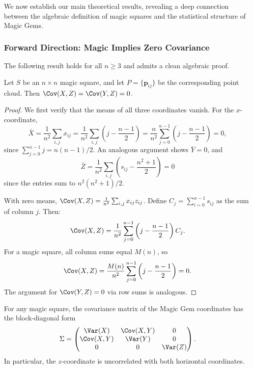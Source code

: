 We now establish our main theoretical results, revealing a deep connection 
between the algebraic definition of magic squares and the statistical structure of Magic Gems.

\subsubsection{Forward Direction: Magic Implies Zero Covariance}

The following result holds for all $n \geq 3$ and admits a clean algebraic proof.

\begin{proposition}
\label{prop:magic_implies_zero_cov}
Let $S$ be an $n \times n$ magic square, and let $P = \{\mathbf{p}_{ij}\}$ be the corresponding point cloud. 
Then $\Cov(X, Z) = \Cov(Y, Z) = 0$.
\end{proposition}

\begin{proof}
We first verify that the means of all three coordinates vanish.
For the $x$-coordinate,
\[
\bar{X} = \frac{1}{n^2} \sum_{i,j} x_{ij} = \frac{1}{n^2} \sum_{i,j} \left( j - \frac{n-1}{2} \right) 
= \frac{n}{n^2} \sum_{j=0}^{n-1} \left( j - \frac{n-1}{2} \right) = 0,
\]
since $\sum_{j=0}^{n-1} j = n(n-1)/2$. An analogous argument shows $\bar{Y} = 0$, and 
\[
\bar{Z} = \frac{1}{n^2} \sum_{i,j} \left( s_{ij} - \frac{n^2+1}{2} \right) = 0
\]
since the entries sum to $n^2(n^2+1)/2$.

With zero means, $\Cov(X, Z) = \frac{1}{n^2} \sum_{i,j} x_{ij} z_{ij}$.
Define $C_j = \sum_{i=0}^{n-1} s_{ij}$ as the sum of column $j$. Then:
\[
\Cov(X, Z) = \frac{1}{n^2} \sum_{j=0}^{n-1} \left( j - \frac{n-1}{2} \right) C_j.
\]
For a magic square, all column sums equal $M(n)$, so
\[
\Cov(X, Z) = \frac{M(n)}{n^2} \sum_{j=0}^{n-1} \left( j - \frac{n-1}{2} \right) = 0.
\]
The argument for $\Cov(Y, Z) = 0$ via row sums is analogous.
\end{proof}

\begin{corollary}
For any magic square, the covariance matrix of the Magic Gem coordinates has the block-diagonal form
\[
\Sigma = \begin{pmatrix}
\Var(X) & \Cov(X,Y) & 0 \\
\Cov(X,Y) & \Var(Y) & 0 \\
0 & 0 & \Var(Z)
\end{pmatrix}.
\]
In particular, the $z$-coordinate is uncorrelated with both horizontal coordinates.
\end{corollary}

